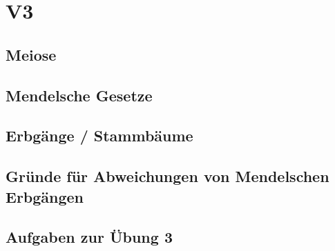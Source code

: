 \section{V3}
\subsection{Meiose}

\subsection{Mendelsche Gesetze}

\subsection{Erbgänge / Stammbäume}

\subsection{Gründe für Abweichungen von Mendelschen Erbgängen}

\subsection{Aufgaben zur Übung 3}